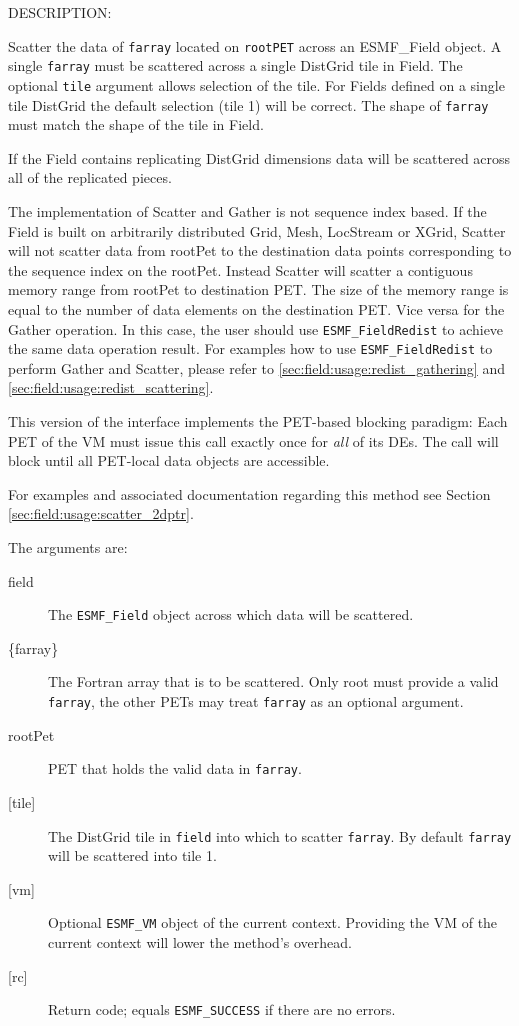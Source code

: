 {\sf DESCRIPTION:\\ }

 
   Scatter the data of {\tt farray} located on {\tt rootPET} 
   across an {ESMF\_Field} object. A single {\tt farray} must be 
   scattered across a single DistGrid tile in Field. The optional {\tt tile} 
   argument allows selection of the tile. For Fields defined on a single 
   tile DistGrid the default selection (tile 1) will be correct. The 
   shape of {\tt farray} must match the shape of the tile in Field. 
   
   If the Field contains replicating DistGrid dimensions data will be 
   scattered across all of the replicated pieces. 
   
   The implementation of Scatter and Gather is not sequence index based. 
   If the Field is built on arbitrarily distributed Grid, Mesh, LocStream or XGrid, 
   Scatter will not scatter data from rootPet 
   to the destination data points corresponding to the sequence index on the rootPet. 
   Instead Scatter will scatter a contiguous memory range from rootPet to 
   destination PET. The size of the memory range is equal to the number of 
   data elements on the destination PET. Vice versa for the Gather operation. 
   In this case, the user should use {\tt ESMF\_FieldRedist} to achieve 
   the same data operation result. For examples how to use {\tt ESMF\_FieldRedist} 
   to perform Gather and Scatter, please refer to 
   \ref{sec:field:usage:redist_gathering} and 
   \ref{sec:field:usage:redist_scattering}. 
   
   This version of the interface implements the PET-based blocking paradigm: 
   Each PET of the VM must issue this call exactly once for {\em all} of its 
   DEs. The call will block until all PET-local data objects are accessible. 
   
   For examples and associated documentation regarding this method see Section 
   \ref{sec:field:usage:scatter_2dptr}. 
   
   The arguments are: 
   \begin{description} 
   \item[field] 
   The {\tt ESMF\_Field} object across which data will be scattered. 
   \item[\{farray\}] 
   The Fortran array that is to be scattered. Only root 
   must provide a valid {\tt farray}, the other PETs may treat 
   {\tt farray} as an optional argument. 
   \item[rootPet] 
   PET that holds the valid data in {\tt farray}. 
   \item[{[tile]}] 
   The DistGrid tile in {\tt field} into which to scatter {\tt farray}. 
   By default {\tt farray} will be scattered into tile 1. 
   \item[{[vm]}] 
   Optional {\tt ESMF\_VM} object of the current context. Providing the 
   VM of the current context will lower the method's overhead. 
   \item[{[rc]}] 
   Return code; equals {\tt ESMF\_SUCCESS} if there are no errors. 
   \end{description} 
   
\setlength{\parskip}{\oldparskip}
\setlength{\parindent}{\oldparindent}
\setlength{\baselineskip}{\oldbaselineskip}
